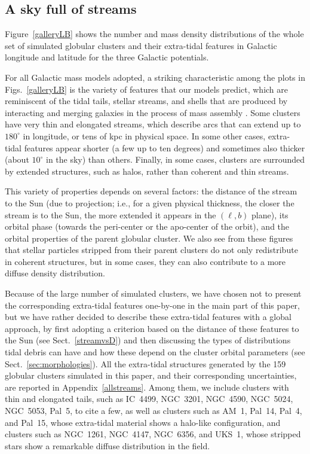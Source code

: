     \subsection{A sky full of streams}\label{results1}

    Figure~\ref{galleryLB} shows the number and mass density distributions of the whole set of simulated globular clusters and their extra-tidal features in Galactic longitude and latitude for the three Galactic potentials.

    For all Galactic mass models adopted, a striking characteristic among the plots in Figs.~\ref{galleryLB} is the variety of features that our models predict, which are reminiscent of the tidal tails, stellar streams, and shells that are produced by interacting and merging galaxies in the process of mass assembly \citep[see, e.g., ][]{2019A&A...632A.122M}. Some clusters have very thin and elongated streams, which describe arcs that can extend up to $180^\circ$ in longitude, or tens of kpc in physical space. In some other cases, extra-tidal features appear shorter (a few up to ten degrees) and sometimes also thicker (about $10^\circ$ in the sky) than others. Finally, in some cases, clusters are surrounded by extended structures, such as halos, rather than coherent and thin streams. 

    This variety of properties depends on several factors: the distance of the stream to the Sun (due to projection; i.e., for a given physical thickness, the closer the stream is to the Sun, the more extended it appears in the $(\ell, b)$ plane), its orbital phase (towards the peri-center or the apo-center of the orbit), and the orbital properties of the parent globular cluster. We also see from these figures that stellar particles stripped from their parent clusters do not only redistribute in coherent structures, but in some cases, they can also contribute to a more diffuse density distribution. 

    Because of the large number of simulated clusters, we have chosen not to present the corresponding extra-tidal features one-by-one in the main part of this paper, but we have rather decided to describe these extra-tidal features with a global approach, by first adopting a criterion based on the distance of these features to the Sun (see Sect.~\ref{streamvsD}) and then discussing the types of distributions tidal debris can have and how these depend on the cluster orbital parameters (see Sect.~\ref{sec:morphologies}). All the extra-tidal structures generated by the 159 globular clusters simulated in this paper, and their corresponding uncertainties, are reported in Appendix~\ref{allstreams}. Among them, we include clusters with thin and elongated tails, such as IC~4499, NGC~3201, NGC~4590, NGC~5024, NGC~5053, Pal~5, to cite a few, as well as clusters such as AM~1, Pal~14, Pal~4, and Pal~15, whose extra-tidal material shows a halo-like configuration, and clusters such as NGC~1261, NGC~4147, NGC~6356, and UKS~1, whose stripped stars show a remarkable diffuse distribution in the field. 

